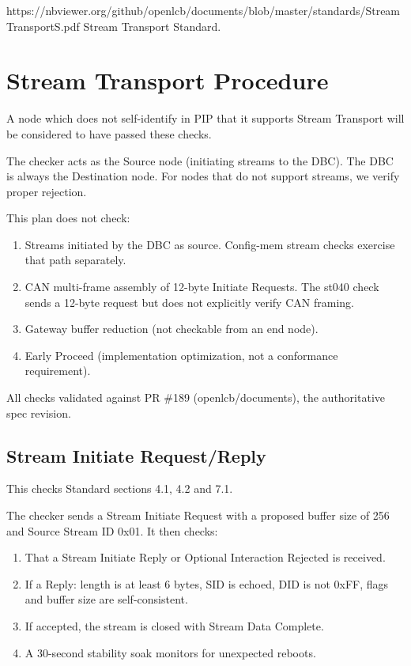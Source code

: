 



\maketitle
\thispagestyle{firststyle}

\introductionCaveats
    {https://nbviewer.org/github/openlcb/documents/blob/master/standards/StreamTransportS.pdf}
    {Stream Transport Standard}.

\section{Stream Transport Procedure}


A node which does not self-identify in PIP that it supports
Stream Transport will be considered to have passed these checks.
\pipsetFootnote

The checker acts as the Source node (initiating streams to the DBC).
The DBC is always the Destination node.  For nodes that do not support
streams, we verify proper rejection.

This plan does not check:
\begin{enumerate}
\item Streams initiated by the DBC as source.  Config-mem stream checks
    exercise that path separately.
\item CAN multi-frame assembly of 12-byte Initiate Requests.  The st040 check
    sends a 12-byte request but does not explicitly verify CAN framing.
\item Gateway buffer reduction (not checkable from an end node).
\item Early Proceed (implementation optimization, not a conformance requirement).
\end{enumerate}

All checks validated against PR \#189 (openlcb/documents), the authoritative
spec revision.

\subsection{Stream Initiate Request/Reply}

This checks Standard sections 4.1, 4.2 and 7.1.

The checker sends a Stream Initiate Request with a proposed buffer size of 256
and Source Stream ID 0x01.  It then checks:
\begin{enumerate}
\item That a Stream Initiate Reply or Optional Interaction Rejected is received.
\item If a Reply: length is at least 6 bytes, SID is echoed, DID is not 0xFF,
    flags and buffer size are self-consistent.
\item If accepted, the stream is closed with Stream Data Complete.
\item A 30-second stability soak monitors for unexpected reboots.
\end{enumerate}

